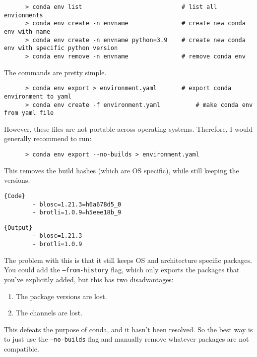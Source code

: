   \begin{example}
    \begin{lstlisting}
      > conda env list                            # list all envionments
      > conda env create -n envname               # create new conda env with name 
      > conda env create -n envname python=3.9    # create new conda env with specific python version
      > conda env remove -n envname               # remove conda env
    \end{lstlisting}
  \end{example} 

  \begin{example}
    The commands are pretty simple. 
    \begin{lstlisting}
      > conda env export > environment.yaml       # export conda environment to yaml 
      > conda env create -f environment.yaml          # make conda env from yaml file 
    \end{lstlisting}

    However, these files are not portable across operating systems. Therefore, I would generally recommend to run: 
    \begin{lstlisting}
      > conda env export --no-builds > environment.yaml 
    \end{lstlisting}
    This removes the build hashes (which are OS specific), while still keeping the versions. 

    \noindent\begin{minipage}{.5\textwidth}
      \begin{lstlisting}[]{Code}
        - blosc=1.21.3=h6a678d5_0
        - brotli=1.0.9=h5eee18b_9
      \end{lstlisting}
      \end{minipage}
      \hfill
      \begin{minipage}{.49\textwidth}
      \begin{lstlisting}[]{Output}
        - blosc=1.21.3
        - brotli=1.0.9
      \end{lstlisting}
    \end{minipage}

    The problem with this is that it still keeps OS and architecture specific packages. You could add the \texttt{--from-history} flag, which only exports the packages that you've explicitly added, but this has two disadvantages: 
    \begin{enumerate}
      \item The package versions are lost. 
      \item The channels are lost. 
    \end{enumerate}
    This defeats the purpose of conda, and it hasn't been resolved. So the best way is to just use the \texttt{--no-builds} flag and manually remove whatever packages are not compatible. 
  \end{example}

